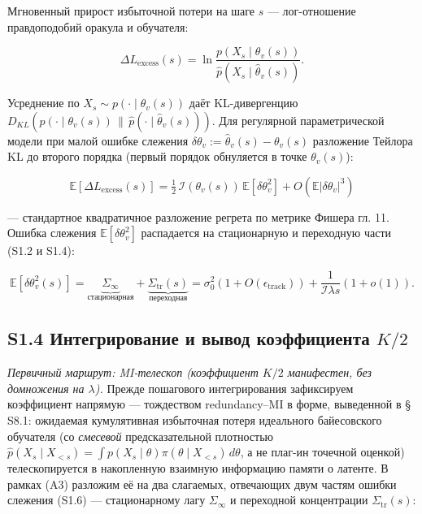 \documentclass[12pt]{iopart}
\providecommand{\texorpdfstring}[2]{#1}
\providecommand{\lt}{<}\providecommand{\gt}{>}
\begin{document}
Мгновенный прирост избыточной потери на шаге \(s\) --- лог-отношение правдоподобий оракула и обучателя:



\[\Delta L_{\text{excess}}(s) = \ln\frac{p(X_s\mid\theta_v(s))}{\hat p(X_s\mid\hat\theta_v(s))}.\]



Усреднение по \(X_s \sim p(\cdot\mid\theta_v(s))\) даёт KL-дивергенцию \(D_{KL}(p(\cdot\mid\theta_v(s)) \,\|\, \hat p(\cdot\mid\hat\theta_v(s)))\). Для регулярной параметрической модели при малой ошибке слежения \(\delta\theta_v := \hat\theta_v(s)-\theta_v(s)\) разложение Тейлора KL до второго порядка (первый порядок обнуляется в точке \(\theta_v(s)\)):



\begin{equation}\mathbb{E}[\Delta L_{\text{excess}}(s)] = \tfrac12\,\mathcal I(\theta_v(s))\,\mathbb{E}[\delta\theta_v^2] + O(\mathbb{E}|\delta\theta_v|^3) \tag{S1.5}\end{equation}



--- стандартное квадратичное разложение регрета по метрике Фишера \cite{ClarkeBarron1990,Rissanen1986,CoverThomas2006} гл. 11. Ошибка слежения \(\mathbb{E}[\delta\theta_v^2]\) распадается на стационарную и переходную части (S1.2 и S1.4):



\begin{equation}\mathbb{E}[\delta\theta_v^2(s)] = \underbrace{\Sigma_\infty}_{\text{стационарная}} + \underbrace{\Sigma_{\text{tr}}(s)}_{\text{переходная}} = \sigma_0^2(1+O(\epsilon_{\text{track}})) + \frac{1}{\mathcal I\lambda s}(1+o(1)). \tag{S1.6}\end{equation}



\subsection{\texorpdfstring{S1.4 Интегрирование и вывод коэффициента \(K/2\)}{S1.4 Интегрирование и вывод коэффициента K/2}}\label{s1.4-ux438ux43dux442ux435ux433ux440ux438ux440ux43eux432ux430ux43dux438ux435-ux438-ux432ux44bux432ux43eux434-ux43aux43eux44dux444ux444ux438ux446ux438ux435ux43dux442ux430-k2}



\emph{Первичный маршрут: MI-телескоп (коэффициент \(K/2\) манифестен, без домножения на \(\lambda\)).} Прежде пошагового интегрирования зафиксируем коэффициент напрямую --- тождеством redundancy--MI \cite{ClarkeBarron1990,Rissanen1986} в форме, выведенной в \cite{Andriishin2026b} § S8.1: ожидаемая кумулятивная избыточная потеря идеального байесовского обучателя (со \emph{смесевой} предсказательной плотностью \(\hat p(X_s\mid X_{\lt s})=\int p(X_s\mid\theta)\pi(\theta\mid X_{\lt s})\,d\theta\), а не плаг-ин точечной оценкой) телескопируется в накопленную взаимную информацию памяти о латенте. В рамках (A3) разложим её на два слагаемых, отвечающих двум частям ошибки слежения (S1.6) --- стационарному лагу \(\Sigma_\infty\) и переходной концентрации \(\Sigma_{\text{tr}}(s)\):
\end{document}
